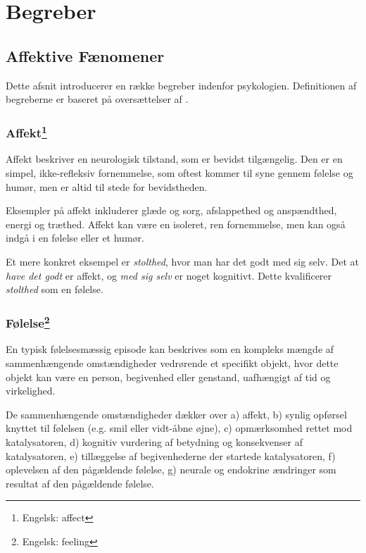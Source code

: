 \chapter{Begreber}

\section{Affektive Fænomener}
Dette afsnit introducerer en række begreber indenfor psykologien.
Definitionen af begreberne er baseret på oversættelser af \citet{ekkekakis}.

\subsection[Affekt]{Affekt\footnote{Engelsk: affect}}
Affekt beskriver en neurologisk tilstand, som er bevidst tilgængelig.
Den er en simpel, ikke-refleksiv fornemmelse, som oftest kommer til syne gennem følelse og humør, men er altid til stede for bevidstheden.

Eksempler på affekt inkluderer glæde og sorg, afslappethed og anspændthed, energi og træthed.
Affekt kan være en isoleret, ren fornemmelse, men kan også indgå i en følelse eller et humør.

Et mere konkret eksempel er \textit{stolthed}, hvor man har det godt med sig selv.
Det at \textit{have det godt} er affekt, og \textit{med sig selv} er noget kognitivt.
Dette kvalificerer \textit{stolthed} som en følelse.

\subsection[Følelse]{Følelse\footnote{Engelsk: feeling}}
En typisk følelsesmæssig episode kan beskrives som en kompleks mængde af sammenhængende omstændigheder vedrørende et specifikt objekt, hvor dette objekt kan være en person, begivenhed eller genstand, uafhængigt af tid og virkelighed.

De sammenhængende omstændigheder dækker over a) affekt, b) synlig opførsel knyttet til følelsen (e.g. smil eller vidt-åbne øjne), c) opmærksomhed rettet mod katalysatoren, d) kognitiv vurdering af betydning og konsekvenser af katalysatoren, e) tillæggelse af begivenhederne der startede katalysatoren, f) oplevelsen af den pågældende følelse, g) neurale og endokrine ændringer som resultat af den pågældende følelse.

